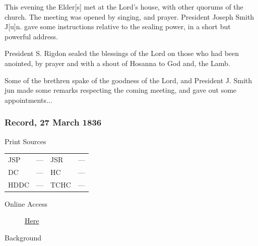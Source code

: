 					This evening the Elder[s] met at the Lord's house, with other quorums of the church. The meeting was opened by singing, and prayer. President Joseph Smith J[u]n. gave some instructions relative to the sealing power, in a short but powerful address.
					
					President S. Rigdon sealed the blessings of the Lord on those who had been anointed, by prayer and with a shout of Hosanna to God and, the Lamb.
					
					Some of the brethren spake of the goodness of the Lord, and President J. Smith jun made some remarks respecting the coming meeting, and gave out some appointments...
					
		\subsubsection{Record, 27 March 1836}
			\label{EMS-1836-JS-27-MAR-1836-REC}
			
			\begin{description}
					\item[Print Sources]
				\end{description}

					\begin{tabular}{p{0.5in}p{1in}p{0.5in}p{1in}}
					JSP	 	& ---				& JSR 		& --- \\
					DC	 	& ---				& HC 		& --- \\
					HDDC 	& ---				& TCHC 		& --- \\
					\end{tabular}
				
				\begin{description}
					\item[Online Access] \href{https://www.josephsmithpapers.org/paper-summary/journal-1835-1836/174}{Here}
				\end{description}
				
				\begin{description}
					\item[Background]
				\end{description}
				
				
